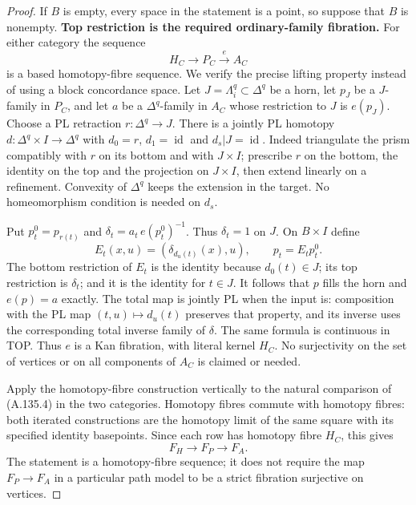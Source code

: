 \begin{proof}
If $B$ is empty, every space in the statement is a point, so suppose
that $B$ is nonempty.
\textbf{Top restriction is the required ordinary-family fibration.}
For either category the sequence
\[
 H_C\longrightarrow P_C\xrightarrow{e} A_C             \tag{A.135.4}
\]
is a based homotopy-fibre sequence. We verify the precise lifting
property instead of using a block concordance space.
Let $J=\Lambda_i^q\subset\Delta^q$ be a horn, let $p_J$ be a
$J$-family in $P_C$, and let $a$ be a $\Delta^q$-family in $A_C$
whose restriction to $J$ is $e(p_J)$. Choose a PL retraction
$r:\Delta^q\to J$. There is a jointly PL homotopy
$d:\Delta^q\times I\to\Delta^q$ with
$d_0=r$, $d_1=\operatorname{id}$ and $d_s|J=\operatorname{id}$.
Indeed triangulate the prism compatibly with $r$ on its bottom and
with $J\times I$; prescribe $r$ on the bottom, the identity on the
top and the projection on $J\times I$, then extend linearly on a
refinement. Convexity of $\Delta^q$ keeps the extension in the target.
No homeomorphism condition is needed on $d_s$.

Put $p^0_t=p_{r(t)}$ and
$\delta_t=a_t\,e(p^0_t)^{-1}$. Thus $\delta_t=1$ on $J$.
On $B\times I$ define
\[
 E_t(x,u)=(\delta_{d_u(t)}(x),u),\qquad
 p_t=E_t p^0_t.                                         \tag{A.135.5}
\]
The bottom restriction of $E_t$ is the identity because $d_0(t)\in J$;
its top restriction is $\delta_t$; and it is the identity for $t\in J$.
It follows that $p$ fills the horn and $e(p)=a$ exactly.
The total map is jointly PL when the input is: composition with the
PL map $(t,u)\mapsto d_u(t)$ preserves that property, and its inverse
uses the corresponding total inverse family of $\delta$. The same
formula is continuous in TOP. Thus $e$ is a Kan fibration, with literal
kernel $H_C$. No surjectivity on the set of vertices or on all
components of $A_C$ is claimed or needed.

Apply the homotopy-fibre construction vertically to the natural
comparison of (A.135.4) in the two categories. Homotopy fibres commute
with homotopy fibres: both iterated constructions are the homotopy
limit of the same square with its specified identity basepoints.
Since each row has homotopy fibre $H_C$, this gives
\[
 F_H\longrightarrow F_P\longrightarrow F_A.             \tag{A.135.6}
\]
The statement is a homotopy-fibre sequence; it does not require the
map $F_P\to F_A$ in a particular path model to be a strict fibration
surjective on vertices.


\end{proof}
